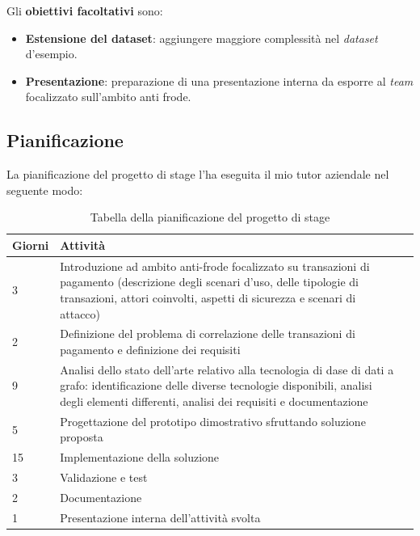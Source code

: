 Gli \textbf{obiettivi facoltativi} sono:
\begin{itemize}
\item{\textbf{Estensione del dataset}:} aggiungere maggiore complessità nel \textit{dataset} d'esempio.
\item{\textbf{Presentazione}:} preparazione di una presentazione interna da esporre al \textit{team} focalizzato sull'ambito anti frode.
\end{itemize}
\newpage
\subsection{Pianificazione}
\label{sec:pian}
La pianificazione del progetto di stage l'ha eseguita il mio tutor aziendale nel seguente modo:

\label{tab:pian}
\begin{table}[!ht]

\begin{tabularx}{\textwidth}{lXl}
\hline\hline
\textbf{Giorni} & \textbf{Attività} \\
\hline
3	& Introduzione ad ambito anti-frode focalizzato su transazioni di pagamento (descrizione degli scenari d'uso, delle tipologie di transazioni, attori coinvolti, aspetti di sicurezza e scenari di attacco)\\
\hline
2	& Definizione del problema di correlazione delle transazioni di pagamento e definizione dei requisiti\\
\hline
9	& Analisi dello stato dell'arte relativo alla tecnologia di dase di dati a grafo: identificazione delle diverse tecnologie disponibili, analisi degli elementi differenti, analisi dei requisiti e documentazione\\
\hline
5	& Progettazione del prototipo dimostrativo sfruttando soluzione proposta\\
\hline
15	& Implementazione della soluzione\\
\hline
3	& Validazione e test \\
\hline
2	 & Documentazione\\
\hline
1	& Presentazione interna dell'attività svolta\\
\hline
\end{tabularx}
\\
\caption{Tabella della pianificazione del progetto di stage}
\end{table}%



